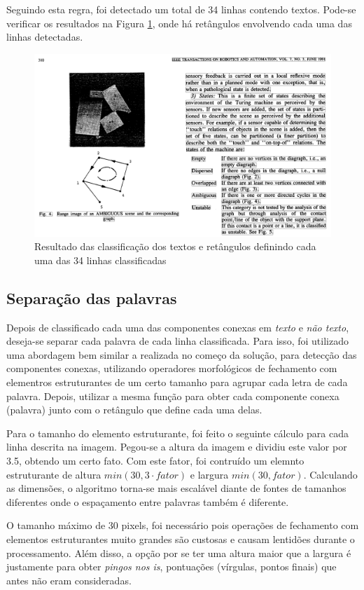 \documentclass{article}
\begin{document}
Seguindo esta regra, foi detectado um total de 34 linhas contendo textos. Pode-se verificar os resultados na Figura \ref{Fig:border_texts}, onde há retângulos envolvendo cada uma das linhas detectadas.

\begin{figure}[!htb]
  \centering
  \includegraphics[width=.8\linewidth]{res/bitmap/img_border_texts.png}
  \caption{Resultado das classificação dos textos e retângulos definindo cada uma das 34 linhas classificadas}\label{Fig:border_texts}
\end{figure}

\subsection{Separação das palavras}

Depois de classificado cada uma das componentes conexas em \textit{texto} e \textit{não texto}, deseja-se separar cada palavra de cada linha classificada. Para isso, foi utilizado uma abordagem bem similar a realizada no começo da solução, para detecção das componentes conexas, utilizando operadores morfológicos de fechamento com elementros estruturantes de um certo tamanho para agrupar cada letra de cada palavra. Depois, utilizar a mesma função para obter cada componente conexa (palavra) junto com o retângulo que define cada uma delas.

Para o tamanho do elemento estruturante, foi feito o seguinte cálculo para cada linha descrita na imagem. Pegou-se a altura da imagem e dividiu este valor por 3.5, obtendo um certo fato. Com este fator, foi contruído um elemnto estruturante de altura $ min(30, 3 \cdot fator) $ e largura $ min(30, fator) $. Calculando as dimensões, o algoritmo torna-se mais escalável diante de fontes de tamanhos diferentes onde o espaçamento entre palavras também é diferente.

O tamanho máximo de 30 pixels, foi necessário pois operações de fechamento com elementos estruturantes muito grandes são custosas e causam lentidões durante o processamento. Além disso, a opção por se ter uma altura maior que a largura é justamente para obter \textit{pingos nos is}, pontuações (vírgulas, pontos finais) que antes não eram consideradas.
\end{document}
